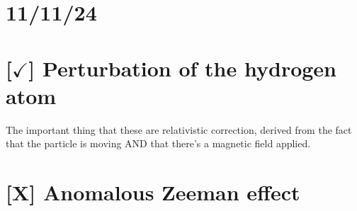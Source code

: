 \section{11/11/24}

\section{[$\checkmark$] Perturbation of the hydrogen atom}

The important thing that these are relativistic correction, derived from the fact that the particle is moving AND that there's a magnetic field applied.

\section{[X] Anomalous Zeeman effect}
